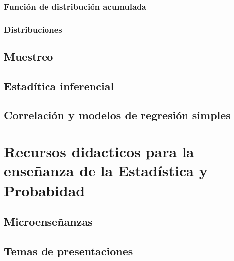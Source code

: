 \documentclass[
]{book}
\begin{document}
\hypertarget{funciuxf3n-de-distribuciuxf3n-acumulada}{%
\subsection{Función de distribución acumulada}\label{funciuxf3n-de-distribuciuxf3n-acumulada}}

\hypertarget{distribuciones}{%
\subsection{Distribuciones}\label{distribuciones}}

\hypertarget{muestreo}{%
\section{Muestreo}\label{muestreo}}

\hypertarget{estaduxedtica-inferencial}{%
\section{Estadítica inferencial}\label{estaduxedtica-inferencial}}

\hypertarget{correlaciuxf3n-y-modelos-de-regresiuxf3n-simples}{%
\section{Correlación y modelos de regresión simples}\label{correlaciuxf3n-y-modelos-de-regresiuxf3n-simples}}

\hypertarget{recursos-didacticos-para-la-enseuxf1anza-de-la-estaduxedstica-y-probabidad}{%
\chapter{Recursos didacticos para la enseñanza de la Estadística y Probabidad}\label{recursos-didacticos-para-la-enseuxf1anza-de-la-estaduxedstica-y-probabidad}}

\hypertarget{microenseuxf1anzas}{%
\section{Microenseñanzas}\label{microenseuxf1anzas}}

\hypertarget{temas-de-presentaciones}{%
\section{Temas de presentaciones}\label{temas-de-presentaciones}}
\end{document}
